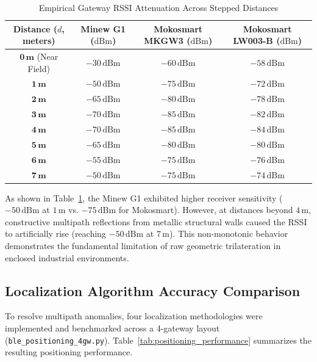 \begin{table}[htbp]
    \centering
    \caption{Empirical Gateway RSSI Attenuation Across Stepped Distances}
    \label{tab:gateway_rssi_comparison}
    \begin{tabularx}{0.85\textwidth}{c c c c}
        \toprule
        \textbf{Distance ($d$, meters)} & \textbf{Minew G1 ($\text{dBm}$)} & \textbf{Mokosmart MKGW3 ($\text{dBm}$)} & \textbf{Mokosmart LW003-B ($\text{dBm}$)} \\
        \midrule
        $\mathbf{0\,\text{m}}$ (Near Field) & $-30\,\text{dBm}$ & $-60\,\text{dBm}$ & $-58\,\text{dBm}$ \\
        $\mathbf{1\,\text{m}}$ & $-50\,\text{dBm}$ & $-75\,\text{dBm}$ & $-72\,\text{dBm}$ \\
        $\mathbf{2\,\text{m}}$ & $-65\,\text{dBm}$ & $-80\,\text{dBm}$ & $-78\,\text{dBm}$ \\
        $\mathbf{3\,\text{m}}$ & $-70\,\text{dBm}$ & $-85\,\text{dBm}$ & $-82\,\text{dBm}$ \\
        $\mathbf{4\,\text{m}}$ & $-70\,\text{dBm}$ & $-85\,\text{dBm}$ & $-84\,\text{dBm}$ \\
        $\mathbf{5\,\text{m}}$ & $-65\,\text{dBm}$ & $-80\,\text{dBm}$ & $-80\,\text{dBm}$ \\
        $\mathbf{6\,\text{m}}$ & $-55\,\text{dBm}$ & $-75\,\text{dBm}$ & $-76\,\text{dBm}$ \\
        $\mathbf{7\,\text{m}}$ & $-50\,\text{dBm}$ & $-75\,\text{dBm}$ & $-74\,\text{dBm}$ \\
        \bottomrule
    \end{tabularx}
\end{table}

As shown in Table~\ref{tab:gateway_rssi_comparison}, the Minew G1 exhibited higher receiver sensitivity ($-50\,\text{dBm}$ at $1\,\text{m}$ vs. $-75\,\text{dBm}$ for Mokosmart). However, at distances beyond $4\,\text{m}$, constructive multipath reflections from metallic structural walls caused the RSSI to artificially rise (reaching $-50\,\text{dBm}$ at $7\,\text{m}$). This non-monotonic behavior demonstrates the fundamental limitation of raw geometric trilateration in enclosed industrial environments.

\subsection{Localization Algorithm Accuracy Comparison}
To resolve multipath anomalies, four localization methodologies were implemented and benchmarked across a 4-gateway layout (\texttt{ble\_positioning\_4gw.py}). Table~\ref{tab:positioning_performance} summarizes the resulting positioning performance.


